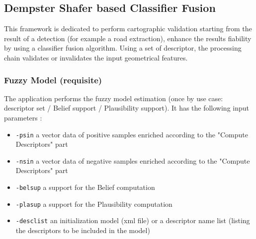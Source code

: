 


\subsection{Dempster Shafer based Classifier Fusion}\label{ssec:classifierfusion}

This framework is dedicated to perform cartographic validation starting
from the result of a detection (for example a road extraction), enhance
the results fiability by using a classifier fusion algorithm. Using a
set of descriptor, the processing chain validates or invalidates the
input geometrical features.

%

\subsubsection{Fuzzy Model (requisite)}

The  application performs the fuzzy
model estimation (once by use case: descriptor set / Belief support /
Plausibility support). It has the following input parameters :
\begin{itemize}
\item \verb?-psin? a vector data of positive samples enriched according to the
"Compute Descriptors" part
\item \verb?-nsin? a vector data of negative samples enriched according to the
"Compute Descriptors" part
\item \verb?-belsup? a support for the Belief computation
\item \verb?-plasup? a support for the Plausibility computation
\item \verb?-desclist? an initialization model (xml file) or a descriptor name list
(listing the descriptors to be included in the model)
\end{itemize}

